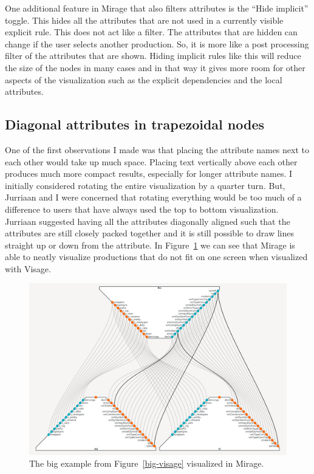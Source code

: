 \documentclass[11pt]{article}
\begin{document}
One additional feature in Mirage that also filters attributes is the ``Hide implicit'' toggle. This hides all the attributes that are not used in a currently visible explicit rule. This does not act like a filter. The attributes that are hidden can change if the user selects another production. So, it is more like a post processing filter of the attributes that are shown. Hiding implicit rules like this will reduce the size of the nodes in many cases and in that way it gives more room for other aspects of the visualization such as the explicit dependencies and the local attributes.

\subsection{Diagonal attributes in trapezoidal nodes}\label{trapezoid}

One of the first observations I made was that placing the attribute names next to each other would take up much space. Placing text vertically above each other produces much more compact results, especially for longer attribute names. I initially considered rotating the entire visualization by a quarter turn. But, Jurriaan and I were concerned that rotating everything would be too much of a difference to users that have always used the top to bottom visualization. Jurriaan suggested having all the attributes diagonally aligned such that the attributes are still closely packed together and it is still possible to draw lines straight up or down from the attribute. In Figure~\ref{big-mirage} we can see that Mirage is able to neatly visualize productions that do not fit on one screen when visualized with Visage.

\begin{figure}[h]
  \centering
  \includegraphics[width=\linewidth]{big-mirage}
  \caption{The big example from Figure~\ref{big-visage} visualized in Mirage.}
  \label{big-mirage}
\end{figure}
\end{document}
